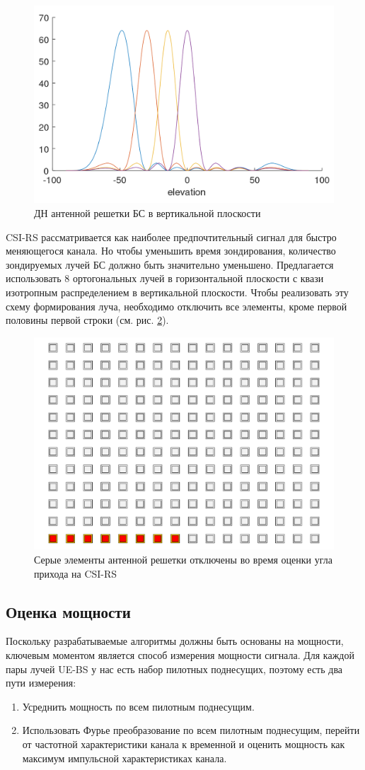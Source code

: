 \begin{figure}[ht]
    \centering
    \includegraphics[width=0.5\linewidth]{figs/fig4.6}
    \caption{ДН антенной решетки БС в вертикальной плоскости}
    \label{fig:4.7}
\end{figure}


CSI-RS рассматривается как наиболее предпочтительный сигнал для быстро меняющегося канала. 
Но чтобы уменьшить время зондирования, количество
зондируемых лучей БС должно быть значительно уменьшено. Предлагается
использовать 8 ортогональных лучей в горизонтальной плоскости с квази изотропным распределением 
в вертикальной плоскости.
Чтобы реализовать эту схему формирования луча, необходимо отключить все
элементы, кроме первой половины первой строки (см. рис. \ref{fig:4.8}).

\begin{figure}[ht]
    \centering
    \includegraphics[width=0.35\linewidth]{figs/fig4.8.pdf}
    \caption{Серые элементы антенной решетки отключены во время оценки угла прихода на CSI-RS}
    \label{fig:4.8}
\end{figure}
\subsection{Оценка мощности}

Поскольку разрабатываемые алгоритмы должны быть основаны на мощности, ключевым
моментом является способ измерения мощности сигнала. Для каждой пары лучей UE-BS
у нас есть набор пилотных поднесущих, поэтому есть два пути измерения:
\begin{enumerate}
    \item Усреднить мощность по всем пилотным поднесущим.
    \item Использовать Фурье преобразование по всем пилотным поднесущим, перейти
    от частотной характеристики канала к временной и оценить мощность как
    максимум импульсной характеристиках канала.
\end{enumerate}

